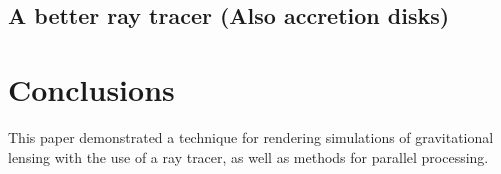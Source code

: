 \subsection {A better ray tracer (Also accretion disks)}


\section{Conclusions}
\label{sec:concl}

This paper demonstrated a technique for rendering simulations of gravitational lensing with the use of a ray tracer, as well as methods for parallel processing. %


